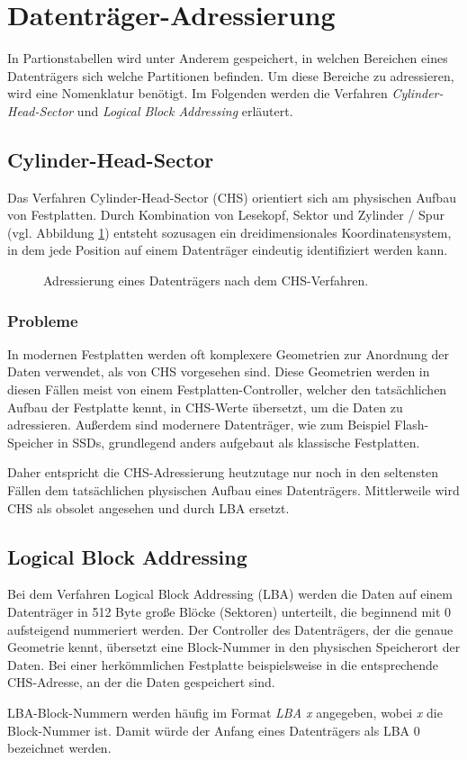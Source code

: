 \section{Datenträger-Adressierung}
\label{sec:addressing}
In Partionstabellen wird unter Anderem gespeichert, in welchen Bereichen eines Datenträgers sich welche Partitionen befinden.
Um diese Bereiche zu adressieren, wird eine Nomenklatur benötigt.
Im Folgenden werden die Verfahren \textit{Cylinder-Head-Sector} und \textit{Logical Block Addressing} erläutert.

\subsection{Cylinder-Head-Sector}
Das Verfahren Cylinder-Head-Sector (CHS) orientiert sich am physischen Aufbau von Festplatten.
Durch Kombination von Lesekopf, Sektor und Zylinder / Spur (vgl. Abbildung \ref{fig:chs}) entsteht sozusagen ein dreidimensionales Koordinatensystem, in dem jede Position auf einem Datenträger eindeutig identifiziert werden kann.

\begin{figure}[ht]
    \centering
    \fbox{}
    \caption{Adressierung eines Datenträgers nach dem CHS-Verfahren. \cite{wikipedia-chs}}
    \label{fig:chs}
\end{figure}

\subsubsection{Probleme}
In modernen Festplatten werden oft komplexere Geometrien zur Anordnung der Daten verwendet, als von CHS vorgesehen sind.
Diese Geometrien werden in diesen Fällen meist von einem Festplatten-Controller, welcher den tatsächlichen Aufbau der Festplatte kennt, in CHS-Werte übersetzt, um die Daten zu adressieren.\cite{pollard2011}
Außerdem sind modernere Datenträger, wie zum Beispiel Flash-Speicher in SSDs, grundlegend anders aufgebaut als klassische Festplatten.

Daher entspricht die CHS-Adressierung heutzutage nur noch in den seltensten Fällen dem tatsächlichen physischen Aufbau eines Datenträgers. 
Mittlerweile wird CHS als obsolet angesehen und durch LBA ersetzt.


\subsection{Logical Block Addressing}
\label{sec:addressing:lba}
Bei dem Verfahren Logical Block Addressing (LBA) werden die Daten auf einem Datenträger in 512 Byte große Blöcke (Sektoren) unterteilt, die beginnend mit 0 aufsteigend nummeriert werden.
Der Controller des Datenträgers, der die genaue Geometrie kennt, übersetzt eine Block-Nummer in den physischen Speicherort der Daten.
Bei einer herkömmlichen Festplatte beispielsweise in die entsprechende CHS-Adresse, an der die Daten gespeichert sind.

LBA-Block-Nummern werden häufig im Format \textit{LBA x} angegeben, wobei \textit{x} die Block-Nummer ist.
Damit würde der Anfang eines Datenträgers als LBA 0 bezeichnet werden.
